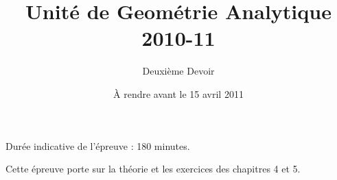 



\title{Unité de Geométrie Analytique  2010-11 }
\author{Deuxième Devoir}
\date{À rendre avant le 15 avril 2011}


\maketitle


\vspace{1cm}

Durée indicative de l'épreuve : 180 minutes.  

Cette épreuve porte sur la théorie et les exercices des chapitres  4 et 5. 

\vspace{1cm}













\corrChapitre{}



